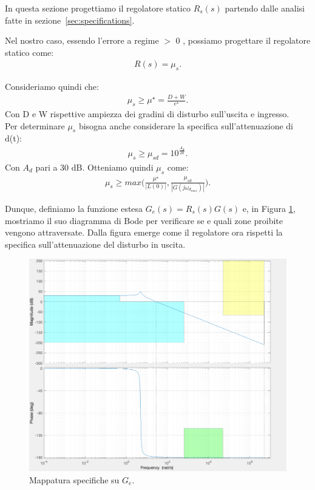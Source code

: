 \documentclass[a4paper, 11pt]{article}
\begin{document}
In questa sezione progettiamo il regolatore statico $R_s(s)$ partendo dalle analisi fatte in sezione~\ref{sec:specifications}.

Nel nostro caso, essendo l'errore a regime $>$ 0 , possiamo progettare il regolatore statico come:
\begin{align}
	R(s) = \mu_s.
\end{align}

Consideriamo quindi che:
\begin{align}
	\mu_s \geq \mu^{\star} = \frac{D+W}{e^{\star}}.
\end{align}
Con D e W rispettive ampiezza dei gradini di disturbo sull'uscita e ingresso.\\
Per determinare $\mu_s$ bisogna anche considerare la specifica sull'attenuazione di d(t):
\begin{align}
	\mu_s \geq \mu_{sd} = 10^{\frac{A_d}{20}}.
\end{align}
Con $A_d$ pari a 30 dB. Otteniamo quindi $\mu_s$ come:
\begin{align}
	\mu_s \geq max\bigg(\frac{\mu^{\star}}{\left| L(0)\right|}, \frac{\mu_{sd}}{\left| G(j\omega_{d_{max}})\right|}\bigg).
\end{align}

Dunque, definiamo la funzione estesa $G_e(s) = R_s(s)G(s)$ e, in Figura \ref{fig:G_e}, mostriamo il suo diagramma di Bode per verificare se e quali zone proibite vengono attraversate.
Dalla figura emerge come il regolatore ora rispetti la specifica sull'attenuazione del disturbo in uscita.

\begin{figure}[h!]
	\centering
	\includegraphics[width=0.75\linewidth]{./images/G_e.png}
	\caption{Mappatura specifiche su $G_e$.}
	\label{fig:G_e}
\end{figure}
\end{document}
